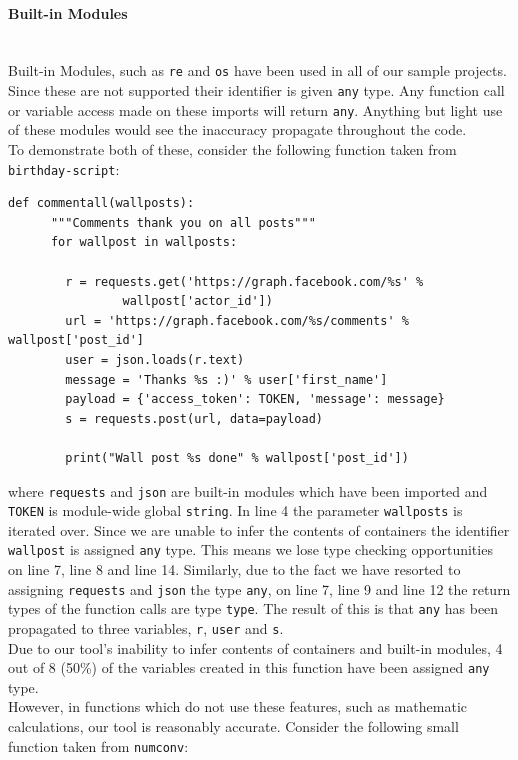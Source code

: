 \documentclass[12pt, titlepage]{article}
\begin{document}
\paragraph*{Built-in Modules}\mbox{}\\
Built-in Modules, such as \texttt{re} and \texttt{os} have been used in all of our sample projects. Since these are not supported their identifier is given \texttt{any} type. Any function call or variable access made on these imports will return \texttt{any}. Anything but light use of these modules would see the inaccuracy propagate throughout the code. \\
\indent To demonstrate both of these, consider the following function taken from \texttt{birthday-script}:
\begin{lstlisting}[mathescape]
    def commentall(wallposts):
      """Comments thank you on all posts"""
      for wallpost in wallposts:

        r = requests.get('https://graph.facebook.com/%s' %
                wallpost['actor_id'])
        url = 'https://graph.facebook.com/%s/comments' % wallpost['post_id']
        user = json.loads(r.text)
        message = 'Thanks %s :)' % user['first_name']
        payload = {'access_token': TOKEN, 'message': message}
        s = requests.post(url, data=payload)

        print("Wall post %s done" % wallpost['post_id'])
\end{lstlisting}
where \texttt{requests} and \texttt{json} are built-in modules which have been imported and \texttt{TOKEN} is module-wide global \texttt{string}. In line 4 the parameter \texttt{wallposts} is iterated over. Since we are unable to infer the contents of containers the identifier \texttt{wallpost} is assigned \texttt{any} type. This means we lose type checking opportunities on line 7, line 8 and line 14. Similarly, due to the fact we have resorted to assigning \texttt{requests} and \texttt{json} the type \texttt{any}, on line 7, line 9 and line 12 the return types of the function calls are type \texttt{type}. The result of this is that \texttt{any} has been propagated to three variables, \texttt{r}, \texttt{user} and \texttt{s}. \\
\indent Due to our tool's inability to infer contents of containers and built-in modules, 4 out of 8 (50\%) of the variables created in this function have been assigned \texttt{any} type. \\
\indent However, in functions which do not use these features, such as mathematic calculations, our tool is reasonably accurate. Consider the following small function taken from \texttt{numconv}:
\end{document}

